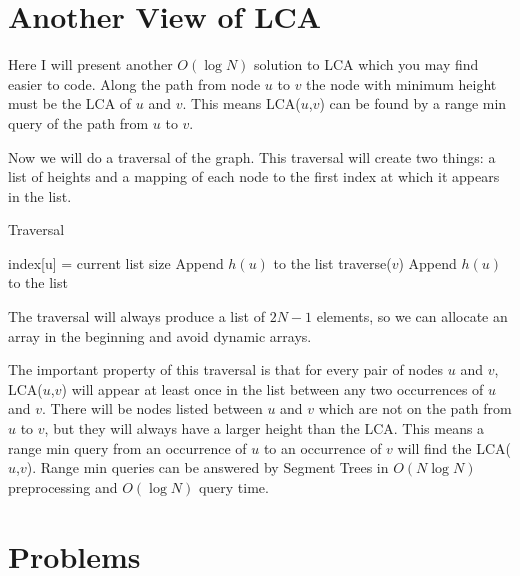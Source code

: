 \documentclass{article}
\begin{document}
\section{Another View of LCA}

Here I will present another $O(\log N)$ solution to LCA which you may find easier to code.  Along the path from node $u$ to $v$ the node with minimum height must be the LCA of $u$ and $v$.  This means LCA($u$,$v$) can be found by a range min query of the path from $u$ to $v$.

Now we will do a traversal of the graph.  This traversal will create two things: a list of heights and a mapping of each node to the first index at which it appears in the list.

\begin{algorithm}[H]
\caption{Traversal}
\begin{algorithmic}
    \State index[u] = current list size
    \State Append $h(u)$ to the list
        \State traverse($v$)
        \State Append $h(u)$ to the list
    \EndFor
\EndFunction
\end{algorithmic}
\end{algorithm}

The traversal will always produce a list of $2N-1$ elements, so we can allocate an array in the beginning and avoid dynamic arrays.

The important property of this traversal is that for every pair of nodes $u$ and $v$, LCA($u$,$v$) will appear at least once in the list between any two occurrences of $u$ and $v$.  There will be nodes listed between $u$ and $v$ which are not on the path from $u$ to $v$, but they will always have a larger height than the LCA.  This means a range min query from an occurrence of $u$ to an occurrence of $v$ will find the LCA($u$,$v$).  Range min queries can be answered by Segment Trees in $O(N\log N)$ preprocessing and $O(\log N)$ query time.

\section {Problems}
\end{document}
